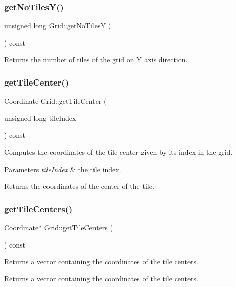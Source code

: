 \subsubsection{\texorpdfstring{getNoTilesY()}{getNoTilesY()}}
{\footnotesize\ttfamily unsigned long Grid\+::get\+No\+TilesY (\begin{DoxyParamCaption}{ }\end{DoxyParamCaption}) const}

\begin{DoxyReturn}{Returns}
the number of tiles of the grid on Y axis direction. 
\end{DoxyReturn}
\mbox{\label{class_grid_aa8d3de015a2b22d0cd0d72b3e7c29088}} 
\subsubsection{\texorpdfstring{getTileCenter()}{getTileCenter()}}
{\footnotesize\ttfamily Coordinate Grid\+::get\+Tile\+Center (\begin{DoxyParamCaption}\item[{unsigned long}]{tile\+Index }\end{DoxyParamCaption}) const}

Computes the coordinates of the tile center given by its index in the grid. 
\begin{DoxyParams}{Parameters}
{\em tile\+Index} & the tile index. \\
\hline
\end{DoxyParams}
\begin{DoxyReturn}{Returns}
the coordinates of the center of the tile. 
\end{DoxyReturn}
\mbox{\label{class_grid_aa1b1f4c938207b16694a27cb9beb66eb}} 
\subsubsection{\texorpdfstring{getTileCenters()}{getTileCenters()}}
{\footnotesize\ttfamily Coordinate$\ast$ Grid\+::get\+Tile\+Centers (\begin{DoxyParamCaption}{ }\end{DoxyParamCaption}) const}

Returns a vector containing the coordinates of the tile centers. \begin{DoxyReturn}{Returns}
a vector containing the coordinates of the tile centers. 
\end{DoxyReturn}
\mbox{\label{class_grid_af4094832e2adedbbd47889973f5a40da}} 
